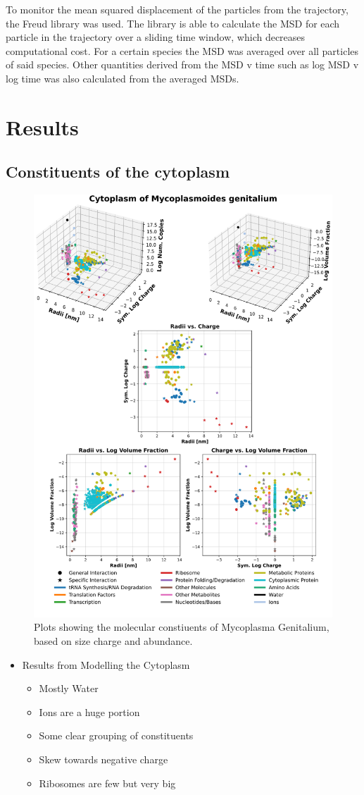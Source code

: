 \documentclass[a4paper,11pt,oneside]{book}
\begin{document}
To monitor the mean squared displacement of the particles from the trajectory, the Freud library was used. The library is able to calculate the MSD for each particle in the trajectory over a sliding time window, which decreases computational cost. For a certain species the MSD was averaged over all particles of said species. Other quantities derived from the MSD v time such as log MSD v log time was also calculated from the averaged MSDs.

\section{Results}

\subsection{Constituents of the cytoplasm}

\begin{figure}[!htbp]
\centering
\includegraphics[width=0.7\linewidth]{files/Fig1-77a0883bc22d4aa609016ce8a1ec042f.png}
\caption[]{Plots showing the molecular constiuents of Mycoplasma Genitalium, based on size charge and abundance.}
\label{Fig1_OmicsPlot}
\end{figure}

\begin{itemize}
\item Results from Modelling the Cytoplasm\begin{itemize}
\item Mostly Water
\item Ions are a huge portion
\item Some clear grouping of constituents
\item Skew towards negative charge
\item Ribosomes are few but very big
\end{itemize}
\end{itemize}
\end{document}
